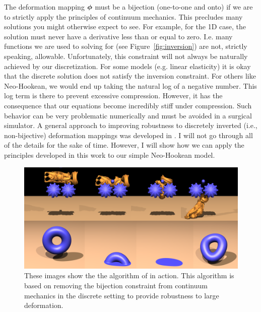 The deformation mapping $\boldsymbol{\phi}$ must be a bijection (one-to-one and onto) if we are to strictly apply the principles of continuum mechanics. This precludes many solutions you might otherwise expect to see. For example, for the 1D case, the solution must never have a derivative less than or equal to zero. I.e. many functions we are used to solving for (see Figure~\ref{fig:inversion}) are not, strictly speaking, allowable. Unfortunately, this constraint will not always be naturally achieved by our discretization. For some models (e.g. linear elasticity) it is okay that the discrete solution does not satisfy the inversion constraint. For others like Neo-Hookean, we would end up taking the natural log of a negative number. This log term is there to prevent excessive compression. However, it has the consequence that our equations become incredibly stiff under compression. Such behavior can be very problematic numerically and must be avoided in a surgical simulator. A general approach to improving robustness to discretely inverted (i.e., non-bijective) deformation mappings was developed in \cite{Irving06}. I will not go through all of the details for the sake of time. However, I will show how we can apply the principles developed in this work to our simple Neo-Hookean model.

\begin{figure}
\includegraphics[width=\columnwidth]{images/buddha_gears}
\caption{These images show the the algorithm of \cite{Irving06} in action. This algorithm is based on removing the bijection constraint from continuum mechanics in the discrete setting to provide robustness to large deformation.}
\end{figure}


